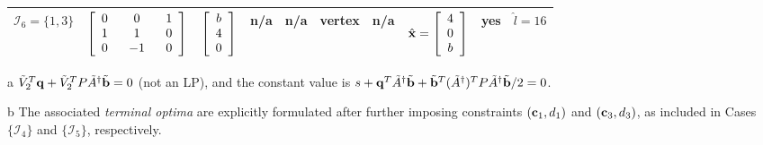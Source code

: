 \documentclass[9pt,twocolumn,twoside,lineno]{pnas-new-1}
\newcommand{\bfb}{{\bf b}}
\newcommand{\bfc}{{\bf c}}
\newcommand{\bfx}{{\bf x}}
\newcommand{\bfq}{{\bf q}}
\newcommand{\calI}{{\mathcal I}}
\theoremstyle{remark}
\begin{document}
\begin{landscape}
\begin{table}[htbp]
\begin{threeparttable}[htbp]
\begin{tabular}{l l l l l l l l l l}
$\calI_6=\{1,3\}$ & \hspace{-0.1cm}$\left[ \renewcommand{\arraystretch}{1} \begin{array}{ccc} 0 & ~~0~~ & 1 \\ 1 & ~~1~~ & 0 \\ 0 & ~~{-1}~~ & 0 \end{array}\right]$ & \hspace{-0.3cm}$\left[ \renewcommand{\arraystretch}{1} \begin{array}{c} b\\ 4\\ 0\end{array}\right]$ & \hspace{-0.15cm}n/a & \hspace{-0.2cm}n/a & \hspace{-0.1cm}vertex & \hspace{-0.1cm}n/a & \hspace{-0.1cm}$\hat\bfx=\left[ \renewcommand{\arraystretch}{1} \begin{array}{c} 4\\ 0\\ b\end{array}\right]$ & \hspace{-0.1cm}yes & \hspace{-0.1cm}$\hat l=16$ \vspace{0.2cm} \\
\hline
\end{tabular}
\begin{tablenotes}
\item [a] $\tilde V_2^T\bfq+\tilde V_2^TP\tilde A^\dagger\tilde \bfb=0$ (not an LP), and the constant value is $s+\bfq^T\tilde A^\dagger\tilde\bfb+\tilde\bfb^T(\tilde A^\dagger)^TP\tilde A^\dagger\tilde\bfb/2=0$.
\item [b] The associated \textit{terminal optima} are explicitly formulated after further imposing constraints $(\bfc_1,d_1)$ and $(\bfc_3,d_3)$, as included in  Cases $\{\calI_4\}$ and $\{\calI_5\}$, respectively.
\end{tablenotes}
\label{Table_Ex_QP_Singular}
\end{threeparttable}
\end{table}
\end{landscape}










\showmatmethods{} %


\showacknow{} %


\end{document}
